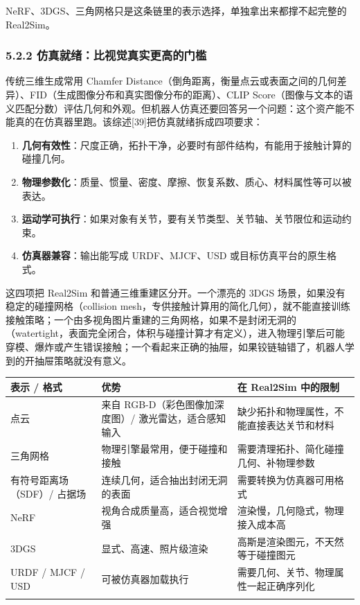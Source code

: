 \documentclass[
  chinese,
]{ctexart}
\providecommand{\tightlist}{%
  \setlength{\itemsep}{0pt}\setlength{\parskip}{0pt}}
\begin{document}
NeRF、3DGS、三角网格只是这条链里的表示选择，单独拿出来都撑不起完整的
Real2Sim。

\subsubsection{5.2.2
仿真就绪：比视觉真实更高的门槛}\label{ux4effux771fux5c31ux7eeaux6bd4ux89c6ux89c9ux771fux5b9eux66f4ux9ad8ux7684ux95e8ux69db}

传统三维生成常用 Chamfer
Distance（倒角距离，衡量点云或表面之间的几何差异）、FID（生成图像分布和真实图像分布的距离）、CLIP
Score（图像与文本的语义匹配分数）评估几何和外观。但机器人仿真还要回答另一个问题：这个资产能不能真的在仿真器里跑。该综述{[}39{]}把仿真就绪拆成四项要求：

\begin{enumerate}
\def\labelenumi{\arabic{enumi}.}
\tightlist
\item
  \textbf{几何有效性}：尺度正确，拓扑干净，必要时有部件结构，有能用于接触计算的碰撞几何。
\item
  \textbf{物理参数化}：质量、惯量、密度、摩擦、恢复系数、质心、材料属性等可以被表达。
\item
  \textbf{运动学可执行}：如果对象有关节，要有关节类型、关节轴、关节限位和运动约束。
\item
  \textbf{仿真器兼容}：输出能写成 URDF、MJCF、USD
  或目标仿真平台的原生格式。
\end{enumerate}

这四项把 Real2Sim 和普通三维重建区分开。一个漂亮的 3DGS
场景，如果没有稳定的碰撞网格（collision
mesh，专供接触计算用的简化几何），就不能直接训练接触策略；一个由多视角图片重建的三角网格，如果不是封闭无洞的（watertight，表面完全闭合，体积与碰撞计算才有定义），进入物理引擎后可能穿模、爆炸或产生错误接触；一个看起来正确的抽屉，如果铰链轴错了，机器人学到的开抽屉策略就没有意义。

\begin{center}
\begin{tabular}{@{}>{\raggedright\arraybackslash}p{} >{\raggedright\arraybackslash}p{} >{\raggedright\arraybackslash}p{}@{}}
\toprule\noalign{}
表示 / 格式 & 优势 & 在 Real2Sim 中的限制 \\
\midrule\noalign{}
点云 & 来自 RGB-D（彩色图像加深度图）/ 激光雷达，适合感知输入 & 缺少拓扑和物理属性，不能直接表达关节和材料 \\
三角网格 & 物理引擎最常用，便于碰撞和接触 & 需要清理拓扑、简化碰撞几何、补物理参数 \\
有符号距离场（SDF）/ 占据场 & 连续几何，适合抽出封闭无洞的表面 & 需要转换为仿真器可用格式 \\
NeRF & 视角合成质量高，适合视觉增强 & 渲染慢，几何隐式，物理接入成本高 \\
3DGS & 显式、高速、照片级渲染 & 高斯是渲染图元，不天然等于碰撞图元 \\
URDF / MJCF / USD & 可被仿真器加载执行 & 需要几何、关节、物理属性一起正确序列化 \\
\bottomrule\noalign{}
\end{tabular}
\end{center}
\end{document}
